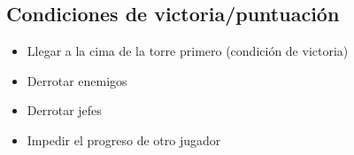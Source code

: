 \subsection{Condiciones de victoria/puntuación} %

\begin{itemize}
    \item Llegar a la cima de la torre primero (condición de victoria)
    \item Derrotar enemigos
    \item Derrotar jefes
    \item Impedir el progreso de otro jugador
\end{itemize}
